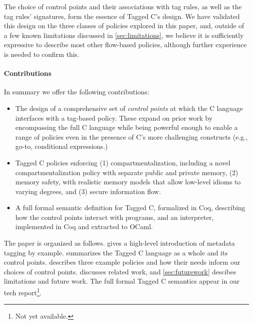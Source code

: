 \documentclass{llncs}
\begin{document}
The choice of control points and their associations with tag rules, as well as the tag rules'
signatures, form the essence of Tagged C's design. 
We have validated this design on the three classes of policies explored in this paper,
and, outside of a few known limitations discussed in \cref{sec:limitations}, %
we believe it is sufficiently expressive to describe most other flow-based policies, although 
further experience is needed to confirm this.

\paragraph*{Contributions}

In summary we offer the following contributions:

\begin{itemize}
\item The design of a comprehensive set of {\em control points} at which the C language interfaces
  with a tag-based policy. These expand on prior work by encompassing the full C language
  while being powerful enough to enable a range of policies even in the presence of C's more challenging
  constructs (e.g., go-to, conditional expressions.)
\item Tagged C policies enforcing (1) compartmentalization, including a novel compartmentalization policy
  with separate public and private memory, (2) memory safety, with realistic memory models that allow
  low-level idioms to varying degrees, and (3) secure information flow.
\item A full formal semantic definition for Tagged C, formalized in Coq, describing how the control points
  interact with programs, and an interpreter, implemented in Coq and extracted to OCaml.
\end{itemize}

The paper is organized as follows.
 gives a high-level introduction of metadata tagging by example.
 summarizes the Tagged C language as a whole and its control points.
 describes three example policies and how their
needs inform our choices of control points. 
 discusses related work, and \cref{sec:futurework} descibes limitations and future work.
The full formal Tagged C semantics appear in our tech report\footnote{Not yet available.}.
\end{document}
